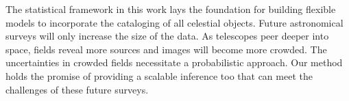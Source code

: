 

The statistical framework in this work lays the foundation for building flexible models to incorporate the cataloging of all celestial objects. 
Future astronomical surveys will only increase the size of the data. 
As telescopes peer deeper into space, fields reveal more sources and images will become more crowded. 
The uncertainties in crowded fields necessitate a probabilistic approach. 
Our method holds the promise of providing  a scalable inference too that can meet the challenges of these future surveys. 





